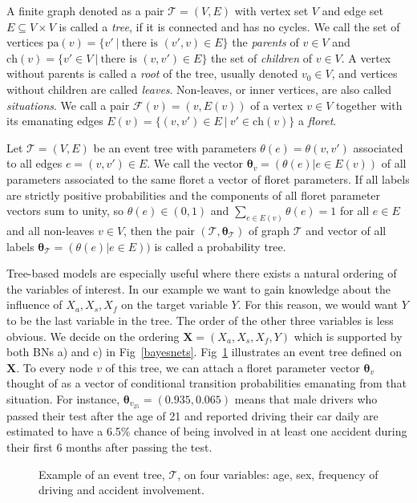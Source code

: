 \documentclass[runningheads]{llncs}
\begin{document}
A finite graph denoted as a pair $\mathcal{T} = (V,E)$ with vertex set $V$ and edge set $E \subseteq V \times V$ is called a \emph{tree}, if it is connected and has no cycles. We call the set of vertices $\text{pa}(v) = \{v' \ | \ \text{there is } (v',v) \in E\}$ the \emph{parents} of $v \in V$ and $\text{ch}(v)=\{v' \in V \ | \ \text{there is } (v,v') \in E\}$ the set of \emph{children} of $v \in V$. A vertex without parents is called a \emph{root} of the tree, usually denoted $v_0 \in V$, and vertices without children are called \emph{leaves}. Non-leaves, or inner vertices, are also called \emph{situations}. We call a pair $\mathcal{F}(v) = (v,E(v))$ of a vertex $v \in V$ together with its emanating edges $E(v) = \{(v,v') \in E \ | \ v' \in \text{ch}(v)\}$ a \emph{floret}.
\begin{definition}
Let $\mathcal{T} = (V, E)$ be an event tree with parameters $\theta(e) = \theta(v, v')$ associated to all edges $e = (v, v') \in E$. We call the vector $\boldsymbol{\theta}_v = (\theta(e)| e \in E(v))$ of all parameters associated to the same floret a vector of floret parameters. If all labels are strictly positive probabilities and the components of all floret parameter vectors sum to unity, so  $\theta(e) \in (0,1)$ and $\sum_{e \in E(v)}\theta(e) = 1$ for all $e \in E$ and all non-leaves $v \in V$, then the pair
$(\mathcal{T}, \boldsymbol{\theta}_{\mathcal{T}})$ of graph $\mathcal{T}$ and vector of all labels $\boldsymbol{\theta}_{\mathcal{T}} = (\theta(e)| e \in E))$ is called a probability tree.
\end{definition}
Tree-based models are especially useful where there exists a natural ordering of the variables of interest. In our example we want to gain knowledge about the influence of $X_a, X_s, X_f$ on the target variable $Y$. For this reason, we would want $Y$ to be the last variable in the tree. The order of the other three variables is less obvious. We decide on the ordering $\boldsymbol{X} = (X_a, X_s, X_f, Y)$ which is supported by both BNs a) and c) in Fig~\ref{bayesnets}. 
Fig~\ref{eventtree} illustrates an event tree defined on $\boldsymbol{X}$. To every node $v$ of this tree, we can attach a floret parameter vector $\boldsymbol{\theta}_v$ thought of as a vector of conditional transition probabilities emanating from that situation. For instance, $\boldsymbol{\theta}_{v_{25}} = (0.935, 0.065)$ means that male drivers who passed their test after the age of 21 and reported driving their car daily are estimated to have a 6.5\% chance of being involved in at least one accident during their first 6 months after passing the test. 
\begin{figure}
\centering

\caption{Example of an event tree, $\mathcal{T}$, on four variables: age, sex, frequency of driving and accident involvement.}
\label{eventtree}
\end{figure}
\end{document}
